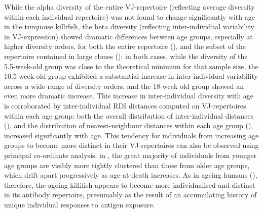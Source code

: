 While the alpha diversity of the entire VJ-repertoire (reflecting average diversity within each individual repertoire) was not found to change significantly with age in the turquoise killifish, the beta diversity (reflecting inter-individual variability in VJ-expression) showed dramatic differences between age groups, especially at higher diversity orders, for both the entire repertoire (), and the subset of the repertoire contained in large clones (): in both cases, while the diversity of the 5.5-week-old group was close to the theoretical minimum for that sample size, the 10.5-week-old group exhibited a substantial increase in inter-individual variability across a wide range of diversity orders, and the 18-week old group showed an even more dramatic increase. This increase in inter-individual diversity with age is corroborated by inter-individual RDI distances computed on VJ-repertoires within each age group: both the overall distribution of inter-individual distances (), and the distribution of nearest-neighbour distances within each age group (), increased significantly with age. This tendency for individuals from increasing age groups to become more distinct in their VJ-repertoires can also be observed using principal co-ordinate analysis:  in , the great majority of individuals from younger age groups are visibly more tightly clustered than those from older age groups, which drift apart progressively as age-at-death increases. As in ageing humans (), therefore, the ageing killifish appears to become more individualised and distinct in its antibody repertoire, presumably as the result of an accumulating history of unique individual responses to antigen exposure.

